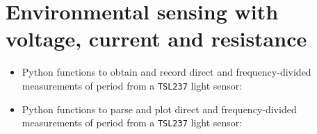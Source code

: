 \section{Environmental sensing with voltage, current and resistance}
\begin{itemize}
	\item Python functions to obtain and record direct and frequency-divided measurements of period from a \texttt{TSL237} light sensor:
	
	\item Python functions to parse and plot direct and frequency-divided measurements of period from a \texttt{TSL237} light sensor:
	

\end{itemize}
%
%

